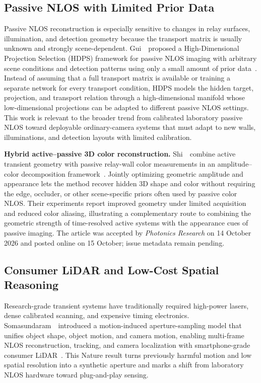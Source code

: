 \subsection{Passive NLOS with Limited Prior Data}
Passive NLOS reconstruction is especially sensitive to changes in relay surfaces, illumination, and detection geometry because the transport matrix is usually unknown and strongly scene-dependent. Gui~\etal~proposed a High-Dimensional Projection Selection (HDPS) framework for passive NLOS imaging with arbitrary scene conditions and detection patterns using only a small amount of prior data~\cite{guiHDPSPassiveNLOS2024}. Instead of assuming that a full transport matrix is available or training a separate network for every transport condition, HDPS models the hidden target, projection, and transport relation through a high-dimensional manifold whose low-dimensional projections can be adapted to different passive NLOS settings. This work is relevant to the broader trend from calibrated laboratory passive NLOS toward deployable ordinary-camera systems that must adapt to new walls, illuminations, and detection layouts with limited calibration.

\vspace{0.8mm}
\noindent \textbf{Hybrid active--passive 3D color reconstruction.}
Shi~\etal~combine active transient geometry with passive relay-wall color measurements in an amplitude--color decomposition framework~\cite{shiHybridActivePassiveColor2026}. Jointly optimizing geometric amplitude and appearance lets the method recover hidden 3D shape and color without requiring the edge, occluder, or other scene-specific priors often used by passive color NLOS. Their experiments report improved geometry under limited acquisition and reduced color aliasing, illustrating a complementary route to combining the geometric strength of time-resolved active systems with the appearance cues of passive imaging. The article was accepted by \emph{Photonics Research} on 14 October 2026 and posted online on 15 October; issue metadata remain pending.

\subsection{Consumer LiDAR and Low-Cost Spatial Reasoning}
Research-grade transient systems have traditionally required high-power lasers, dense calibrated scanning, and expensive timing electronics. Somasundaram~\etal~introduced a motion-induced aperture-sampling model that unifies object shape, object motion, and camera motion, enabling multi-frame NLOS reconstruction, tracking, and camera localization with smartphone-grade consumer LiDAR~\cite{somasundaramConsumerLiDAR2026}. This Nature result turns previously harmful motion and low spatial resolution into a synthetic aperture and marks a shift from laboratory NLOS hardware toward plug-and-play sensing.

